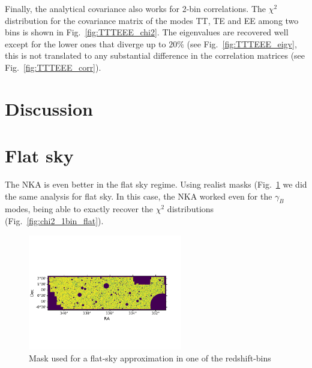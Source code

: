 \documentclass[a4paper,11pt]{article}
\begin{document}
Finally, the analytical covariance also works for 2-bin correlations. The
$\chi^2$ distribution for the covariance matrix of the modes TT, TE and EE
among two bins is shown in Fig.~\ref{fig:TTTEEE_chi2}. The eigenvalues
are recovered well except for the lower ones that diverge up to $20\%$ (see
Fig.~\ref{fig:TTTEEE_eigv}, this is not translated to any substantial
difference in the correlation matrices (see Fig.~\ref{fig:TTTEEE_corr}).





\section{Discussion}\label{sec:discussion}

\appendix
\section{Flat sky}
The NKA is even better in the flat sky regime. Using realist masks
(Fig.~\ref{fig:mask_flat} we did the same analysis for flat sky. In this case,
the NKA worked even for the $\gamma_B$ modes, being able to exactly recover
the $\chi^2$ distributions (Fig.~\ref{fig:chi2_1bin_flat}).

\begin{figure}[htb]
  \centering
  \includegraphics[width=0.6\textwidth]{./figures/mask-lss_flat1.pdf}
  \caption{Mask used for a flat-sky approximation in one of the redshift-bins}
  \label{fig:mask_flat}
\end{figure}
\end{document}
